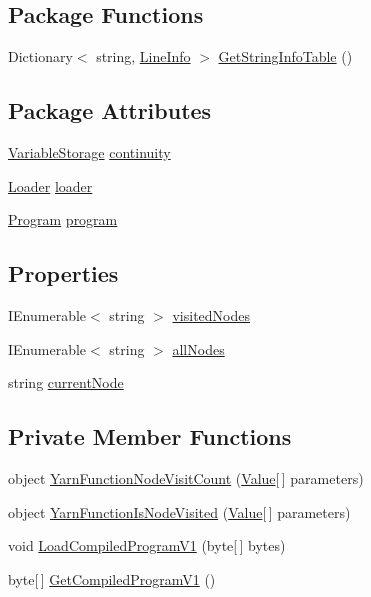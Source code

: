\subsection*{Package Functions}
\begin{DoxyCompactItemize}
\item 
Dictionary$<$ string, \hyperlink{a00103}{Line\-Info} $>$ \hyperlink{a00070_a5c5117de678626ebcfb9a6f875e6e53a}{Get\-String\-Info\-Table} ()
\end{DoxyCompactItemize}
\subsection*{Package Attributes}
\begin{DoxyCompactItemize}
\item 
\hyperlink{a00164}{Variable\-Storage} \hyperlink{a00070_ae94eaa4b03b432422f5d205fabe37ff5}{continuity}
\item 
\hyperlink{a00105}{Loader} \hyperlink{a00070_a98bbe0ac2ccadeeeb7e05e3e6e19f2e0}{loader}
\item 
\hyperlink{a00124}{Program} \hyperlink{a00070_a0a1cca92325f430425d784d416cb5c2b}{program}
\end{DoxyCompactItemize}
\subsection*{Properties}
\begin{DoxyCompactItemize}
\item 
I\-Enumerable$<$ string $>$ \hyperlink{a00070_ac5661051e0b7f44527fe526c7766dbbf}{visited\-Nodes}
\item 
I\-Enumerable$<$ string $>$ \hyperlink{a00070_a0ee573e3d072bccf98ba1d975612d42c}{all\-Nodes}
\item 
string \hyperlink{a00070_af368b5c342d585dc6953876c5965ccc8}{current\-Node}
\end{DoxyCompactItemize}
\subsection*{Private Member Functions}
\begin{DoxyCompactItemize}
\item 
object \hyperlink{a00070_a10c9f22d3f55e74f091cd6069c431094}{Yarn\-Function\-Node\-Visit\-Count} (\hyperlink{a00161}{Value}\mbox{[}$\,$\mbox{]} parameters)
\item 
object \hyperlink{a00070_a1ab129bd84381928531d503304ca08d6}{Yarn\-Function\-Is\-Node\-Visited} (\hyperlink{a00161}{Value}\mbox{[}$\,$\mbox{]} parameters)
\item 
void \hyperlink{a00070_a706df08e842c2419f7a66fd40c0a544f}{Load\-Compiled\-Program\-V1} (byte\mbox{[}$\,$\mbox{]} bytes)
\item 
byte\mbox{[}$\,$\mbox{]} \hyperlink{a00070_a070898dbc07fd7d0a74d7c3ac1848beb}{Get\-Compiled\-Program\-V1} ()
\end{DoxyCompactItemize}
